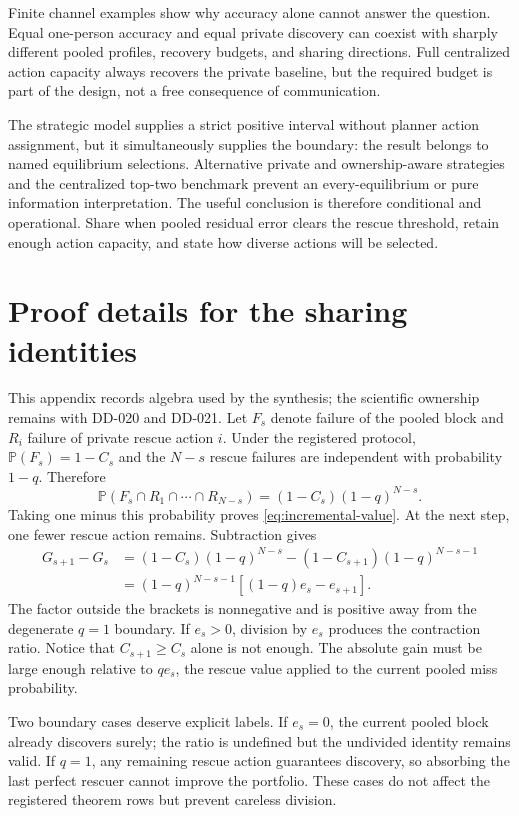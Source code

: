 \documentclass[12pt]{article}
\newcommand{\Prb}{\mathbb{P}}
\theoremstyle{definition}
\begin{document}
Finite channel examples show why accuracy alone cannot answer the question.
Equal one-person accuracy and equal private discovery can coexist with sharply
different pooled profiles, recovery budgets, and sharing directions. Full
centralized action capacity always recovers the private baseline, but the
required budget is part of the design, not a free consequence of communication.

The strategic model supplies a strict positive interval without planner action
assignment, but it simultaneously supplies the boundary: the result belongs to
named equilibrium selections. Alternative private and ownership-aware strategies
and the centralized top-two benchmark prevent an every-equilibrium or pure
information interpretation. The useful conclusion is therefore conditional and
operational. Share when pooled residual error clears the rescue threshold, retain
enough action capacity, and state how diverse actions will be selected.

\appendix
\section{Proof details for the sharing identities}

This appendix records algebra used by the synthesis; the scientific ownership
remains with DD-020 and DD-021. Let $F_s$ denote failure of the pooled block and
$R_i$ failure of private rescue action $i$. Under the registered protocol,
$\Prb(F_s)=1-C_s$ and the $N-s$ rescue failures are independent with probability
$1-q$. Therefore
\[
 \Prb(F_s\cap R_1\cap\cdots\cap R_{N-s})=(1-C_s)(1-q)^{N-s}.
\]
Taking one minus this probability proves \cref{eq:incremental-value}. At the next
step, one fewer rescue action remains. Subtraction gives
\begin{align*}
G_{s+1}-G_s
&=(1-C_s)(1-q)^{N-s}-(1-C_{s+1})(1-q)^{N-s-1}\\
&=(1-q)^{N-s-1}\left[(1-q)e_s-e_{s+1}\right].
\end{align*}
The factor outside the brackets is nonnegative and is positive away from the
degenerate $q=1$ boundary. If $e_s>0$, division by $e_s$ produces the contraction
ratio. Notice that $C_{s+1}\geq C_s$ alone is not enough. The absolute gain must
be large enough relative to $q e_s$, the rescue value applied to the current
pooled miss probability.

Two boundary cases deserve explicit labels. If $e_s=0$, the current pooled block
already discovers surely; the ratio is undefined but the undivided identity
remains valid. If $q=1$, any remaining rescue action guarantees discovery, so
absorbing the last perfect rescuer cannot improve the portfolio. These cases do
not affect the registered theorem rows but prevent careless division.
\end{document}
